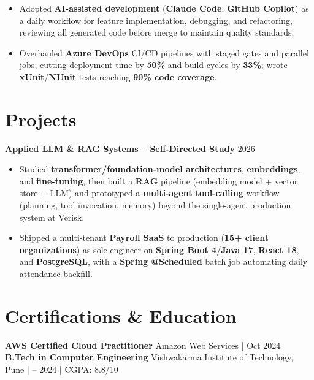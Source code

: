 \documentclass[a4paper,10pt]{article}
\begin{document}
\begin{itemize}[leftmargin=*]
    \item Adopted \textbf{AI-assisted development} (\textbf{Claude Code}, \textbf{GitHub Copilot}) as a daily workflow for feature implementation, debugging, and refactoring, reviewing all generated code before merge to maintain quality standards.
    \item Overhauled \textbf{Azure DevOps} CI/CD pipelines with staged gates and parallel jobs, cutting deployment time by \textbf{50\%} and build cycles by \textbf{33\%}; wrote \textbf{xUnit}/\textbf{NUnit} tests reaching \textbf{90\% code coverage}.
\end{itemize}

\section*{Projects}

\textbf{Applied LLM \& RAG Systems -- Self-Directed Study} \hfill 2026
\begin{itemize}[leftmargin=*]
    \item Studied \textbf{transformer/foundation-model architectures}, \textbf{embeddings}, and \textbf{fine-tuning}, then built a \textbf{RAG} pipeline (embedding model + vector store + LLM) and prototyped a \textbf{multi-agent tool-calling} workflow (planning, tool invocation, memory) beyond the single-agent production system at Verisk.
    \item Shipped a multi-tenant \textbf{Payroll SaaS} to production (\textbf{15+ client organizations}) as sole engineer on \textbf{Spring Boot 4}/\textbf{Java 17}, \textbf{React 18}, and \textbf{PostgreSQL}, with a \textbf{Spring @Scheduled} batch job automating daily attendance backfill.
\end{itemize}

\section*{Certifications \& Education}
\textbf{AWS Certified Cloud Practitioner} \hfill Amazon Web Services \;|\; Oct 2024 \\
\textbf{B.Tech in Computer Engineering} \hfill Vishwakarma Institute of Technology, Pune \;| -- 2024 \;|\; CGPA: 8.8/10
\end{document}
